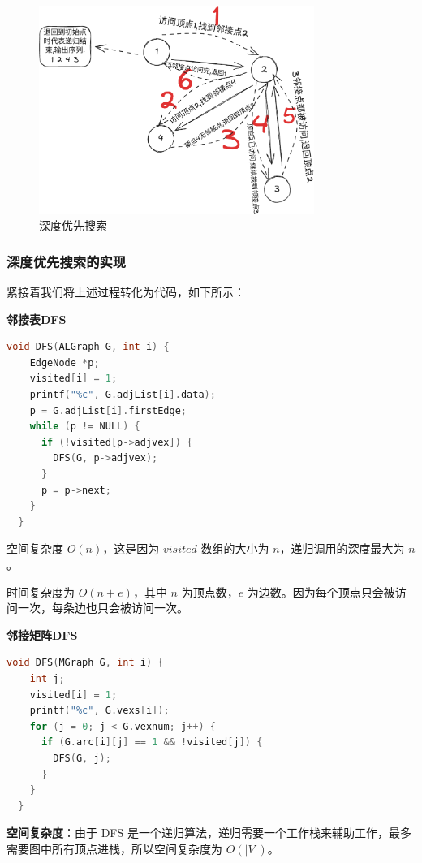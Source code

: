 \documentclass[lang=cn,newtx,10pt,scheme=chinese]{../elegantbook}
\begin{document}
\begin{figure}[h!]
  \centering
  \includegraphics[width=0.8\textwidth]{./figure/pdf/cropped/depthFirst.pdf}
  \caption{深度优先搜索}
  \label{fig:depthFirst}
\end{figure}


\subsubsection{深度优先搜索的实现}
紧接着我们将上述过程转化为代码，如下所示：

\textbf{邻接表DFS}

\begin{lstlisting}[language=C++, caption={邻接表DFS}]
  void DFS(ALGraph G, int i) {
    EdgeNode *p;
    visited[i] = 1;
    printf("%c", G.adjList[i].data);
    p = G.adjList[i].firstEdge;
    while (p != NULL) {
      if (!visited[p->adjvex]) {
        DFS(G, p->adjvex);
      }
      p = p->next;
    }
  }
\end{lstlisting}

空间复杂度 $O(n)$，这是因为 $visited$ 数组的大小为 $n$，递归调用的深度最大为 $n$。

时间复杂度为 $O(n+e)$，其中 $n$ 为顶点数，$e$ 为边数。因为每个顶点只会被访问一次，每条边也只会被访问一次。

\textbf{邻接矩阵DFS}

\begin{lstlisting}[language=C++, caption={邻接矩阵DFS}]
  void DFS(MGraph G, int i) {
    int j;
    visited[i] = 1;
    printf("%c", G.vexs[i]);
    for (j = 0; j < G.vexnum; j++) {
      if (G.arc[i][j] == 1 && !visited[j]) {
        DFS(G, j);
      }
    }
  }
\end{lstlisting}

\textbf{空间复杂度}：由于 DFS 是一个递归算法，递归需要一个工作栈来辅助工作，最多需要图中所有顶点进栈，所以空间复杂度为 $O(|V|)$。
\end{document}
